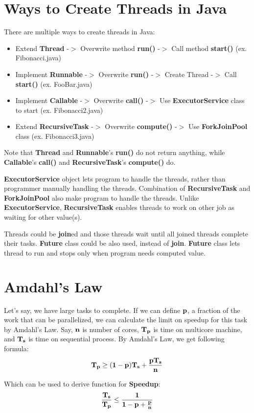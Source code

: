 \documentclass[twoside]{article}
\begin{document}
\section{Ways to Create Threads in Java}
There are multiple ways to create threads in Java:
\begin{itemize}
	\item Extend {\bf Thread} -$>$ Overwrite method {\bf run()} -$>$ Call method {\bf start()} (ex. Fibonacci.java)
	\item Implement {\bf Runnable} -$>$ Overwrite {\bf run()} -$>$ Create Thread -$>$ Call {\bf start()} (ex. FooBar.java)
	\item Implement {\bf Callable} -$>$ Overwrite {\bf call()} -$>$ Use {\bf ExecutorService} class to start (ex. Fibonacci2.java)
	\item Extend {\bf RecursiveTask} -$>$ Overwrite {\bf compute()} -$>$ Use {\bf ForkJoinPool} class (ex. Fibonacci3.java)
\end{itemize}
Note that {\bf Thread} and {\bf Runnable}'s {\bf run()} do not return anything, while {\bf Callable}'s {\bf call()} and {\bf RecursiveTask}'s {\bf compute()} do.

{\bf ExecutorService} object lets program to handle the threads, rather than programmer manually handling the threads.
Combination of {\bf RecursiveTask} and {\bf ForkJoinPool} also make program to handle the threads.
Unlike {\bf ExecutorService}, {\bf RecursiveTask} enables threads to work on other job as waiting for other value(s).

Threads could be {\bf join}ed and those threads wait until all joined threads complete their tasks.
{\bf Future} class could be also used, instead of {\bf join}. {\bf Future} class lets thread to run and stops only when program needs computed value.

\section{Amdahl's Law}
Let's say, we have large tasks to complete.
If we can define ${\bf p}$, a fraction of the work that can be parallelized, we can calculate the limit on speedup for this task by Amdahl's Law.
Say, ${\bf n}$ is number of cores, ${\bf T_p}$ is time on multicore machine, and ${\bf T_s}$ is time on sequential process.
By Amdahl's Law, we get following formula:
\[{\bf T_p \ge (1-p)T_s + \frac{pT_s}{n} }\]

Which can be used to derive function for {\bf Speedup}:
\[{\bf \frac{T_s}{T_p} \le \frac{1}{1 - p + \frac{p}{n}} }\]
\end{document}
